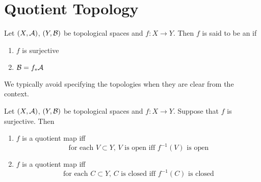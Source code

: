 \documentclass{book}
\begin{document}
	
	
	
	
	
	
	
	
	
	
	
	
	
	
	
	
	
	
	\newpage
	\section{Quotient Topology}
	
	\begin{defn} 
	Let $(X, \mathcal{A})$, $(Y, \mathcal{B})$ be topological spaces and $f:X \rightarrow Y$. Then $f$ is said to be an  if 
	\begin{enumerate}
	\item $f$ is surjective
	\item $\mathcal{B} = f_*\mathcal{A}$
	\end{enumerate}
	\end{defn}
	
	\begin{note}
	We typically avoid specifying the topologies when they are clear from the context.
	\end{note}

	\begin{ex} 
		Let $(X, \mathcal{A})$, $(Y, \mathcal{B})$ be topological spaces and $f:X \rightarrow Y$. Suppose that $f$ is surjective. Then 
		\begin{enumerate}
			\item $f$ is a quotient map iff 
			$$ \text{for each $V \subset Y$, $V$ is open iff $f^{-1}(V)$ is open} $$
			\item $f$ is a quotient map iff 
			$$ \text{for each $C \subset Y$, $C$ is closed iff $f^{-1}(C)$ is closed} $$
		\end{enumerate}
	\end{ex}
	
\end{document}
